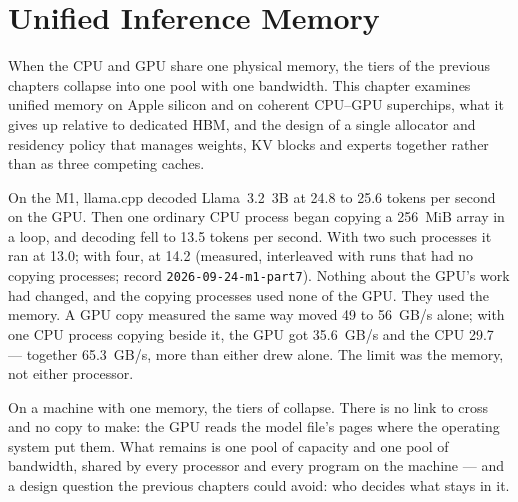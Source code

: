 \chapter{Unified Inference Memory}\label{ch:unified-memory}

\begin{ChapterIntent}
When the CPU and GPU share one physical memory, the tiers of the previous
chapters collapse into one pool with one bandwidth. This chapter examines
unified memory on Apple silicon and on coherent CPU--GPU superchips, what it
gives up relative to dedicated HBM, and the design of a single allocator and
residency policy that manages weights, KV blocks and experts together rather
than as three competing caches.
\end{ChapterIntent}


On the M1, llama.cpp decoded Llama~3.2~3B at 24.8 to 25.6 tokens per second on
the GPU. Then one ordinary CPU process began copying a 256~MiB array in a loop,
and decoding fell to 13.5 tokens per second. With two such processes it ran at
13.0; with four, at 14.2 (measured, interleaved with runs that had no copying
processes; record \texttt{2026-09-24-m1-part7}). Nothing about the GPU's work
had changed, and the copying processes used none of the GPU. They used the
memory. A GPU copy measured the same way moved 49 to 56~GB/s alone; with one CPU
process copying beside it, the GPU got 35.6~GB/s and the CPU 29.7 --- together
65.3~GB/s, more than either drew alone. The limit was the memory, not either
processor.

On a machine with one memory, the tiers of  collapse. There
is no link to cross and no copy to make: the GPU reads the model file's pages
where the operating system put them. What remains is one pool of capacity and
one pool of bandwidth, shared by every processor and every program on the
machine --- and a design question the previous chapters could avoid: who
decides what stays in it.

